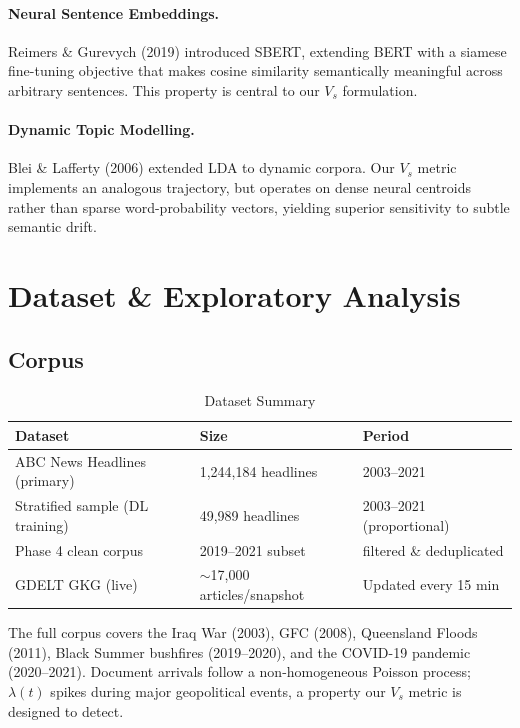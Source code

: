 \documentclass[12pt,a4paper]{article}
\begin{document}
\paragraph{Neural Sentence Embeddings.}
Reimers \& Gurevych (2019) introduced SBERT, extending BERT with a siamese fine-tuning
objective that makes cosine similarity semantically meaningful across arbitrary sentences.
This property is central to our $V_s$ formulation.

\paragraph{Dynamic Topic Modelling.}
Blei \& Lafferty (2006) extended LDA to dynamic corpora. Our $V_s$ metric implements an
analogous trajectory, but operates on dense neural centroids rather than sparse
word-probability vectors, yielding superior sensitivity to subtle semantic drift.

\section{Dataset \& Exploratory Analysis}

\subsection{Corpus}

\begin{table}[H]
\centering
\caption{Dataset Summary}
\begin{tabular}{lll}
\toprule
\textbf{Dataset} & \textbf{Size} & \textbf{Period} \\
\midrule
ABC News Headlines (primary) & 1,244,184 headlines & 2003--2021 \\
Stratified sample (DL training) & 49,989 headlines & 2003--2021 (proportional) \\
Phase 4 clean corpus & 2019--2021 subset & filtered \& deduplicated \\
GDELT GKG (live) & $\sim$17,000 articles/snapshot & Updated every 15 min \\
\bottomrule
\end{tabular}
\label{tab:datasets}
\end{table}

The full corpus covers the Iraq War (2003), GFC (2008), Queensland Floods (2011),
Black Summer bushfires (2019--2020), and the COVID-19 pandemic (2020--2021).
Document arrivals follow a non-homogeneous Poisson process; $\lambda(t)$ spikes
during major geopolitical events, a property our $V_s$ metric is designed to detect.
\end{document}
